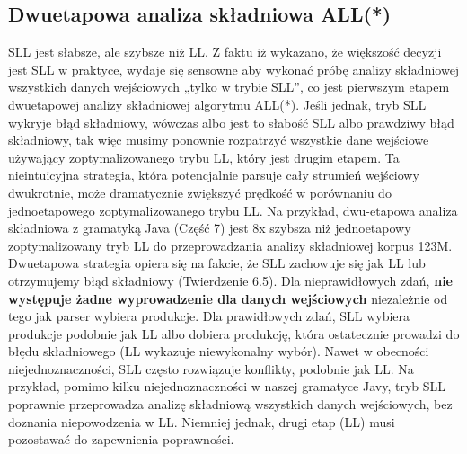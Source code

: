 ﻿\subsection{Dwuetapowa analiza składniowa ALL(*)}
SLL jest słabsze, ale szybsze niż LL.
Z faktu iż wykazano, że większość decyzji jest SLL w praktyce, wydaje się
sensowne aby wykonać próbę analizy składniowej wszystkich danych wejściowych
„tylko w trybie SLL”, co jest pierwszym etapem dwuetapowej analizy składniowej algorytmu ALL(*).
Jeśli jednak, tryb SLL wykryje błąd składniowy, wówczas albo jest to słabość SLL
albo prawdziwy błąd składniowy, tak więc musimy ponownie rozpatrzyć wszystkie
dane wejściowe używający zoptymalizowanego trybu LL, który jest drugim etapem.
Ta nieintuicyjna strategia, która potencjalnie parsuje cały strumień wejściowy dwukrotnie,
może dramatycznie zwiększyć prędkość w porównaniu do jednoetapowego zoptymalizowanego trybu LL.
Na przykład, dwu-etapowa analiza składniowa z gramatyką Java (Część 7) jest 8x szybsza
niż jednoetapowy zoptymalizowany tryb LL do przeprowadzania analizy składniowej korpus 123M.
Dwuetapowa strategia opiera się na fakcie, że SLL zachowuje się jak LL
lub otrzymujemy błąd składniowy (Twierdzenie 6.5).
Dla nieprawidłowych zdań, \textbf{nie występuje żadne wyprowadzenie dla danych
wejściowych} niezależnie od tego jak parser wybiera produkcje.
Dla prawidłowych zdań, SLL wybiera produkcje podobnie jak LL albo dobiera produkcję,
która ostatecznie prowadzi do błędu składniowego (LL wykazuje niewykonalny wybór).
Nawet w obecności niejednoznaczności, SLL często rozwiązuje konflikty, podobnie jak LL.
Na przykład, pomimo kilku niejednoznaczności w naszej gramatyce Javy, tryb SLL
poprawnie przeprowadza analizę składniową wszystkich danych wejściowych,
bez doznania niepowodzenia w LL. Niemniej jednak,
drugi etap (LL) musi pozostawać do zapewnienia poprawności.
